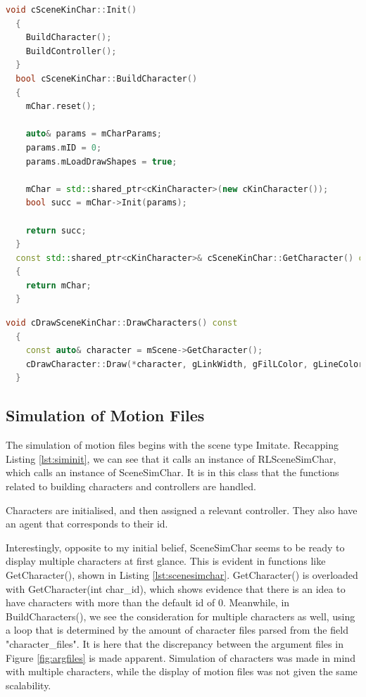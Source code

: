 \documentclass{l4proj}
\begin{document}
\begin{lstlisting}[language=C++, float, caption={Functions inside SceneKinChar}, label=lst:scenekinchar]
  void cSceneKinChar::Init()
  {
    BuildCharacter();
    BuildController();
  }
  bool cSceneKinChar::BuildCharacter()
  {
    mChar.reset();

    auto& params = mCharParams;
    params.mID = 0;
    params.mLoadDrawShapes = true;

    mChar = std::shared_ptr<cKinCharacter>(new cKinCharacter());
    bool succ = mChar->Init(params);

    return succ;
  }
  const std::shared_ptr<cKinCharacter>& cSceneKinChar::GetCharacter() const
  {
    return mChar;
  }
\end{lstlisting}
\begin{lstlisting}[language=C++, float, caption={Functions inside DrawSceneKinChar}, label=lst:drawscenekinchar]
  void cDrawSceneKinChar::DrawCharacters() const
  {
    const auto& character = mScene->GetCharacter();
    cDrawCharacter::Draw(*character, gLinkWidth, gFilLColor, gLineColor);
  }
\end{lstlisting}

\subsection{Simulation of Motion Files}
The simulation of motion files begins with the scene type Imitate. Recapping Listing \ref{lst:siminit}, we can see that it calls an instance of RLSceneSimChar, which calls an instance of SceneSimChar. It is in this class that the functions related to building characters and controllers are handled.

Characters are initialised, and then assigned a relevant controller. They also have an agent that corresponds to their id.

Interestingly, opposite to my initial belief, SceneSimChar seems to be ready to display multiple characters at first glance. This is evident in functions like GetCharacter(), shown in Listing \ref{lst:scenesimchar}. GetCharacter() is overloaded with GetCharacter(int char\_id), which shows evidence that there is an idea to have characters with more than the default id of 0. Meanwhile, in BuildCharacters(), we see the consideration for multiple characters as well, using a loop that is determined by the amount of character files parsed from the field "character\_files". It is here that the discrepancy between the argument files in Figure \ref{fig:argfiles} is made apparent. Simulation of characters was made in mind with multiple characters, while the display of motion files was not given the same scalability.
\end{document}
